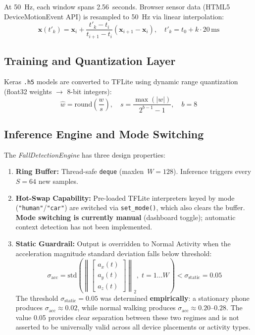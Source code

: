 \documentclass[12pt,a4paper]{article}
\begin{document}
At 50~Hz, each window spans 2.56~seconds. Browser sensor data
(HTML5 DeviceMotionEvent API) is resampled to 50~Hz via linear interpolation:
\begin{equation}
  \mathbf{x}(t'_k) = \mathbf{x}_i +
  \frac{t'_k-t_i}{t_{i+1}-t_i}(\mathbf{x}_{i+1}-\mathbf{x}_i),
  \quad t'_k = t_0 + k\cdot20\,\text{ms}
  \label{eq:resampling}
\end{equation}

\subsection{Training and Quantization Layer}

Keras \texttt{.h5} models are converted to TFLite using dynamic range
quantization (float32 weights $\to$ 8-bit integers):
\begin{equation}
  \hat{w} = \text{round}\!\left(\frac{w}{s}\right),\quad
  s=\frac{\max(|w|)}{2^{b-1}-1},\quad b=8
  \label{eq:quantization}
\end{equation}

\subsection{Inference Engine and Mode Switching}
\label{sec:inference_engine}

The \textit{FallDetectionEngine} has three design properties:

\begin{enumerate}
  \item \textbf{Ring Buffer:} Thread-safe \texttt{deque} (maxlen~$W=128$).
        Inference triggers every $S=64$ new samples.

  \item \textbf{Hot-Swap Capability:} Pre-loaded TFLite interpreters keyed
        by mode (\texttt{"human"}/\texttt{"car"}) are switched via
        \texttt{set\_mode()}, which also clears the buffer. \textbf{Mode
        switching is currently manual} (dashboard toggle); automatic context
        detection has not been implemented.

  \item \textbf{Static Guardrail:} Output is overridden to Normal Activity
        when the acceleration magnitude standard deviation falls below threshold:
        \begin{equation}
          \sigma_{\text{acc}} = \text{std}\!\left(\left\|
            \begin{bmatrix}a_x(t)\\a_y(t)\\a_z(t)\end{bmatrix}
          \right\|_2,\;t=1\ldots W\right) < \sigma_{\text{static}} = 0.05
          \label{eq:guardrail}
        \end{equation}
        The threshold $\sigma_{\text{static}}=0.05$ was determined
        \textbf{empirically}: a stationary phone produces
        $\sigma_{\text{acc}}\approx0.02$, while normal walking produces
        $\sigma_{\text{acc}}\approx0.20$--$0.28$. The value 0.05 provides
        clear separation between these two regimes and is not asserted to be
        universally valid across all device placements or activity types.
\end{enumerate}
\end{document}
